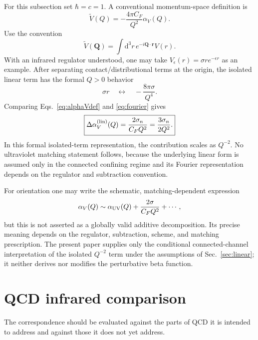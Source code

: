 \documentclass[10pt]{article}
\newcommand{\dd}{\mathrm{d}}
\begin{document}
For this subsection set $\hbar=c=1$.  A conventional momentum-space definition is
\begin{equation}
\widetilde V(Q)=-\frac{4\pi C_F}{Q^2}\alpha_V(Q).
\label{eq:alphaVdef}
\end{equation}
Use the convention
\begin{equation}
\widetilde V(\bm Q)=\int \dd^3r\,e^{-i\bm Q\cdot\bm r}V(r).
\label{eq:fourierConvention}
\end{equation}
With an infrared regulator understood, one may take $V_\epsilon(r)=\sigma r e^{-\epsilon r}$ as an example. After separating contact/distributional terms at the origin, the isolated linear term has the formal $Q>0$ behavior
\begin{equation}
\sigma r\quad\longleftrightarrow\quad -\frac{8\pi\sigma}{Q^4}.
\label{eq:fourier}
\end{equation}
Comparing Eqs.~\eqref{eq:alphaVdef} and \eqref{eq:fourier} gives
\begin{equation}
\boxed{
\Delta\alpha_V^{(\rm lin)}(Q)
=\frac{2\sigma_n}{C_FQ^2}
=\frac{3\sigma_n}{2Q^2}.
}
\label{eq:alphaV}
\end{equation}
In this formal isolated-term representation, the contribution scales as $Q^{-2}$. No ultraviolet matching statement follows, because the underlying linear form is assumed only in the connected confining regime and its Fourier representation depends on the regulator and subtraction convention.

For orientation one may write the schematic, matching-dependent expression
\begin{equation}
\alpha_V(Q)\sim\alpha_{\rm UV}(Q)+\frac{2\sigma}{C_FQ^2}+\cdots,
\label{eq:targetdecomp}
\end{equation}
but this is not asserted as a globally valid additive decomposition. Its precise meaning depends on the regulator, subtraction, scheme, and matching prescription. The present paper supplies only the conditional connected-channel interpretation of the isolated $Q^{-2}$ term under the assumptions of Sec.~\ref{sec:linear}; it neither derives nor modifies the perturbative beta function.

\section{QCD infrared comparison}
\label{sec:comparison}

The correspondence should be evaluated against the parts of QCD it is intended to address and against those it does not yet address.
\end{document}
